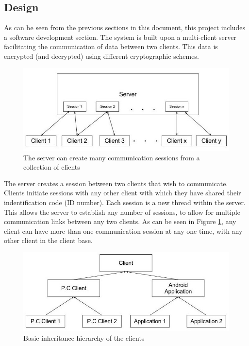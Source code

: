 \documentclass[a4paper,11pt]{article}
\begin{document}
\subsection{Design}

As can be seen from the previous sections in this document, this project includes a software development section. The system is built upon a multi-client server facilitating the communication of data between two clients.  This data is encrypted (and decrypted) using different cryptographic schemes.

\begin{figure}[htb]
\centering
\includegraphics[scale=0.35]{designs1.jpg}
\caption{The server can create many communication sessions from a collection of clients}
\label{fig:designs1}
\end{figure}

The server creates a session between two clients that wish to communicate. Clients initiate sessions with any other client with which they have shared their indentification code (ID number). Each session is a new thread within the server. This allows the server to establish any number of sessions, to allow for multiple communication links between any two clients. As can be seen in Figure \ref{fig:designs1}, any client can have more than one communication session at any one time, with any other client in the client base.

\begin{figure}[htb]
\centering
\includegraphics[scale=0.35]{designs2.jpg}
\caption{Basic inheritance hierarchy of the clients}
\label{fig:designs2}
\end{figure}
\end{document}
